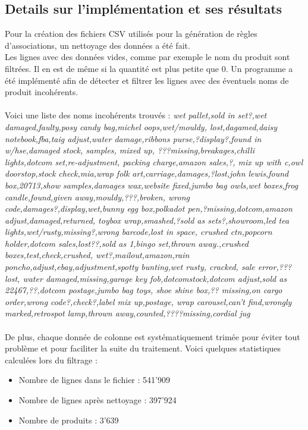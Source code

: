 \documentclass[a4paper]{article}
\begin{document}
\subsection{Details sur l'implémentation et ses résultats}
Pour la création des fichiers CSV utilisés pour la génération de règles d'associations, un nettoyage des données a été fait.
\\
Les lignes avec des données vides, comme par exemple le nom du produit sont filtrées.
Il en est de même si la quantité est plus petite que 0.
Un programme a été implémenté afin de détecter et filtrer les lignes avec des éventuels noms de produit incohérents.
\\\\
Voici une liste des noms incohérents trouvés :
\textit{wet pallet,sold in set?,wet damaged,faulty,posy candy bag,michel oops,wet/mouldy,
lost,dagamed,daisy notebook,fba,taig adjust,water damage,ribbons purse,?display?,found in w/hse,damaged stock,
samples,
mixed up,
???missing,breakages,chilli lights,dotcom set,re-adjustment, packing charge,amazon sales,?,
mix up with c,owl doorstop,stock check,mia,wrap folk art,carriage,damages,?lost,john lewis,found box,20713,show samples,damages wax,website fixed,jumbo bag owls,wet boxes,frog candle,found,given away,mouldy,???,broken,
wrong code,damages?,display,wet,bunny egg box,polkadot pen,?missing,dotcom,amazon adjust,damaged,returned,
toybox  wrap,smashed,?sold as sets?,showroom,led tea lights,wet/rusty,missing?,wrong barcode,lost in space,
crushed ctn,popcorn holder,dotcom sales,lost??,sold as 1,bingo set,thrown away.,crushed boxes,test,check,crushed,
wet?,mailout,amazon,rain poncho,adjust,ebay,adjustment,spotty bunting,wet rusty,
cracked,
sale error,???lost,
water damaged,missing,garage key fob,dotcomstock,dotcom adjust,sold as 22467,??,dotcom postage,jumbo bag toys,
shoe shine box,?? missing,on cargo order,wrong code?,check?,label mix up,postage,
wrap carousel,can't find,wrongly marked,retrospot lamp,thrown away,counted,????missing,cordial jug}
\\\\
De plus, chaque donnée de colonne est systématiquement trimée pour éviter tout problème et pour faciliter la suite du traitement. 
Voici quelques statistiques calculées lors du filtrage :
\\

\begin{itemize}
	\item Nombre de lignes dans le fichier : 541'909
	\item Nombre de lignes après nettoyage : 397'924
	\item Nombre de produits : 3'639
\end{itemize}
\end{document}
